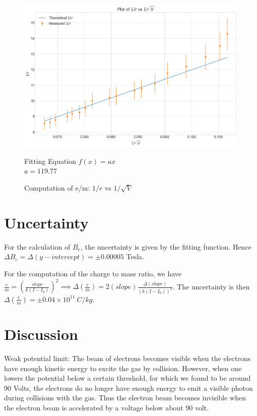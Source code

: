 \documentclass[a4paper,12pt]{article}
\begin{document}
\begin{figure}[H]
  \centering
  \includegraphics[width=0.8\linewidth]{../code/Pankaj/Charge To Mass Ratio.png}   
  \begin{center}
    Fitting Equation $f(x) = ax$ \\
    $a = 119.77$
  \end{center}   
  \caption{Computation of e/m: $1/r$ vs $1/\sqrt{V}$}
  \label{e_m}
\end{figure}

\section{Uncertainty}

For the calculation of $B_e$, the uncertainty is given by the fitting function. Hence $\Delta B_e = \Delta (y-intercept) = \pm 0.00005$ Tesla.

For the computation of the charge to mass ratio, we have $\frac{e}{m} = (\frac{slope}{k(I-I_0)})^2 \implies 
\Delta (\frac{e}{m}) = 2 (slope) \frac{\Delta (slope)}{(k(I-I_0))^2}$. The uncertainty is then $\Delta (\frac{e}{m}) = \pm 0.04 \times 10^{11}\ C/kg$.

\section{Discussion}


Weak potential limit: The beam of electrons becomes visible when the electrons have enough kinetic energy to excite the gas by collision. However, when one lowers the 
potential below a certain threshold, for which we found to be around 90 Volts, the electrons do no longer have enough energy to emit a visible 
photon during collisions with the gas. Thus the electron beam becomes invisible when the electron beam is accelerated by a voltage below about 90 volt.
\end{document}
